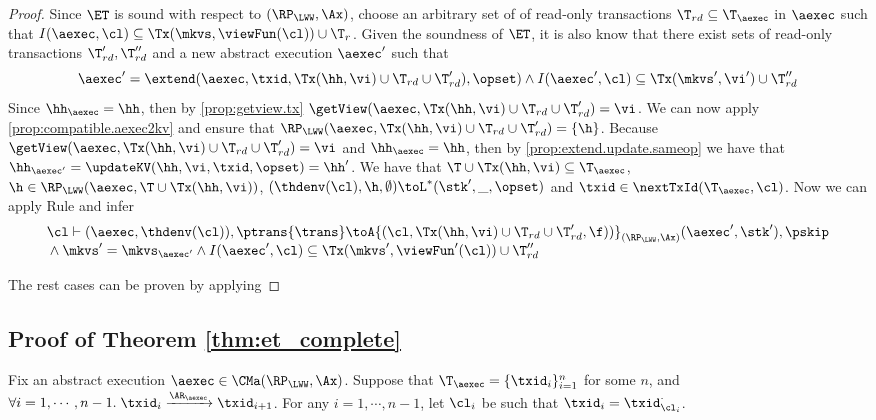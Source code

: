 \begin{proof}
Since \( \ET \) is sound with respect to \( (\RP_{\LWW}, \Ax) \),
choose an arbitrary set of of read-only transactions $\T_{rd} \subseteq \T_{\aexec}$ in \( \aexec \) such that \( I(\aexec, \cl) \subseteq \Tx(\mkvs, \viewFun(\cl)) \cup \T_{r}\).
Given the soundness of \( \ET \), it is also know that there exist sets of read-only transactions  \( \T'_{rd}, \T''_{rd} \) and a new abstract execution \( \aexec' \) such that 
\[
    \aexec' = \extend(\aexec, \txid, \Tx(\hh, \vi) \cup \T_{rd} \cup \T'_{rd} ), \opset)  \land I(\aexec', \cl)  \subseteq  \Tx(\mkvs', \vi') \cup \T''_{rd}
\]
Since $\hh_{\aexec} = \hh$, then by \cref{prop:getview.tx} $\getView(\aexec, \Tx(\hh, \vi) \cup \T_{rd} \cup \T'_{rd}) = \vi$. 
We can now apply \cref{prop:compatible.aexec2kv} and ensure that $\RP_{\LWW}(\aexec, \Tx(\hh, \vi) \cup \T_{rd} \cup \T'_{rd}) = \{\h\}$.
Because $\getView(\aexec, \Tx(\hh, \vi) \cup \T_{rd} \cup \T'_{rd}) = \vi$ and $\hh_{\aexec} = \hh$,
then by \cref{prop:extend.update.sameop} we have that $\hh_{\aexec'} = \updateKV(\hh, \vi, \txid, \opset) = \hh'$. 
We  have that $\T \cup \Tx(\hh, \vi) \subseteq \T_{\aexec}$, $\h \in \RP_{\LWW}(\aexec, \T \cup \Tx(\hh, \vi))$,
$(\thdenv(\cl), \h, \emptyset) \toL^{\ast} (\stk', \_, \opset)$ and $\txid \in \nextTxId(\T_{\aexec}, \cl)$. 
Now we can apply Rule  and infer
\[
\begin{array}{@{}l@{}}
    \cl \vdash (\aexec, \thdenv(\cl)), \ptrans{\trans} 
    \toA{(\cl, \Tx(\hh, \vi) \cup \T_{rd} \cup \T'_{rd}, \f))}_{(\RP_{\LWW}, \Ax)}  
    (\aexec', \stk'), \pskip \\
    {} \land \mkvs' = \mkvs_{\aexec'} 
    \land I(\aexec', \cl) \subseteq \Tx(\mkvs', \viewFun'(\cl)) \cup \T''_{rd} 
\end{array}
\]

The rest cases can be proven by applying \ih

\end{proof}


\subsection{Proof of Theorem \ref{thm:et_complete}}
\label{sec:et-completeness}
Fix an abstract execution $\aexec \in \CMa(\RP_{\LWW}, \Ax)$. 
Suppose that $\T_{\aexec} = \{\txid_{i}\}_{i=1}^{n}$ for some $n$, and 
$\forall i=1,\cdots,n-1.\;\txid_{i} \xrightarrow{\AR_{\aexec}} \txid_{i+1}$.
For any $i=1,\cdots,n-1$, let $\cl_{i}$ be such that $\txid_{i} = \txid_{\cl_{i}}^{\cdot}$.

